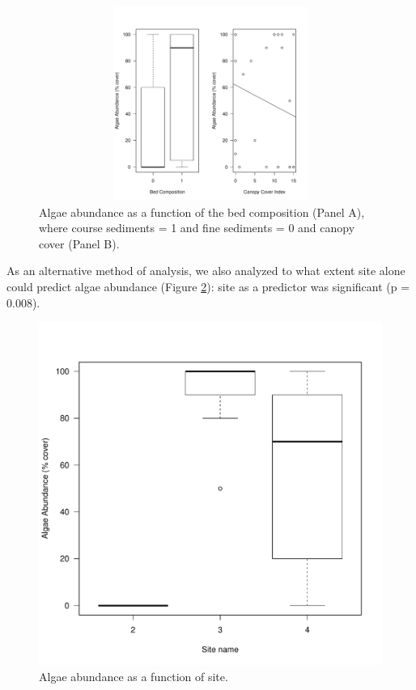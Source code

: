 \documentclass{article}\usepackage[]{graphicx}\usepackage[]{color}
\makeatletter
\def\maxwidth{ %
  \ifdim\Gin@nat@width>\linewidth
    \linewidth
  \else
    \Gin@nat@width
  \fi
}
\newenvironment{knitrout}{}{} %
\makeatother
\begin{document}
\begin{figure}[!ht]
\begin{knitrout}
\color{fgcolor}
\includegraphics[width=5in,height=2.5in]{figure/unnamed-chunk-2-1} 

\end{knitrout}
\caption{Algae abundance as a function of the bed composition (Panel A), where course sediments = 1 and fine sediments = 0 and canopy cover (Panel B).}
\label{fig:algae}
\end{figure}

As an alternative method of analysis, we also analyzed to what extent site alone could predict algae abundance (Figure \ref{fig:algaesite}): site as a predictor was significant (p = 0.008).

\begin{figure}[!ht]
\begin{knitrout}
\color{fgcolor}
\includegraphics[width=\maxwidth]{figure/unnamed-chunk-3-1} 

\end{knitrout}
\caption{Algae abundance as a function of site.}
\label{fig:algaesite}
\end{figure}
\end{document}
